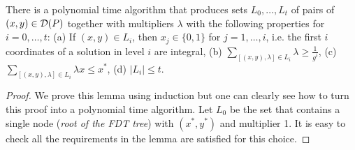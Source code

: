 \begin{lemma}\label{prune}
	There is a polynomial time algorithm that produces sets $L_0,\ldots,L_t$ of pairs of $(x,y)\in \operatorname{\mathcal{D}}(P)$ together with multipliers $\lambda$ with the following properties for $i=0,\ldots,t$:
		(a) If $(x,y)\in L_i$, then $x_j \in \{0,1\}$ for $j=1,\ldots,i$, i.e. the first $i$ coordinates of a solution in level $i$ are integral, (b) $\sum_{[(x,y),\lambda]\in L_i} \lambda\geq\frac{1}{g^i}$, (c) $\sum_{[(x,y),\lambda]\in L_i}\lambda x \leq x^*$, (d) $|L_i|\leq t$.
\end{lemma}
\begin{proof}
	We prove this lemma using induction but one can clearly see how to turn this proof into a polynomial time algorithm. Let $L_0$ be the set that contains a single node (\textit{root of the FDT tree}) with $(x^*,y^*)$ and multiplier 1. It is easy to check all the requirements in the lemma are satisfied for this choice.
	

\end{proof}
